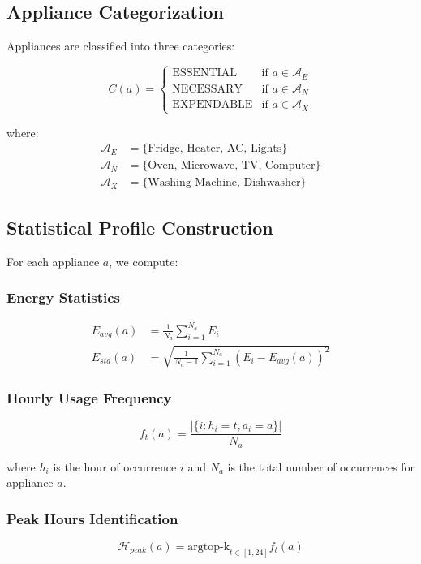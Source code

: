 \documentclass[conference]{IEEEtran}
\begin{document}
\subsection{Appliance Categorization}
Appliances are classified into three categories:

\begin{equation}
C(a) = \begin{cases}
\text{ESSENTIAL} & \text{if } a \in \mathcal{A}_E \\
\text{NECESSARY} & \text{if } a \in \mathcal{A}_N \\
\text{EXPENDABLE} & \text{if } a \in \mathcal{A}_X
\end{cases}
\end{equation}

where:
\begin{align}
\mathcal{A}_E &= \{\text{Fridge, Heater, AC, Lights}\} \\
\mathcal{A}_N &= \{\text{Oven, Microwave, TV, Computer}\} \\
\mathcal{A}_X &= \{\text{Washing Machine, Dishwasher}\}
\end{align}

\subsection{Statistical Profile Construction}
For each appliance $a$, we compute:

\subsubsection{Energy Statistics}
\begin{align}
E_{avg}(a) &= \frac{1}{N_a}\sum_{i=1}^{N_a} E_i \\
E_{std}(a) &= \sqrt{\frac{1}{N_a-1}\sum_{i=1}^{N_a}(E_i - E_{avg}(a))^2}
\end{align}

\subsubsection{Hourly Usage Frequency}
\begin{equation}
f_t(a) = \frac{|\{i : h_i = t, a_i = a\}|}{N_a}
\end{equation}

where $h_i$ is the hour of occurrence $i$ and $N_a$ is the total number of occurrences for appliance $a$.

\subsubsection{Peak Hours Identification}
\begin{equation}
\mathcal{H}_{peak}(a) = \text{argtop-k}_{t \in [1,24]} f_t(a)
\end{equation}
\end{document}
